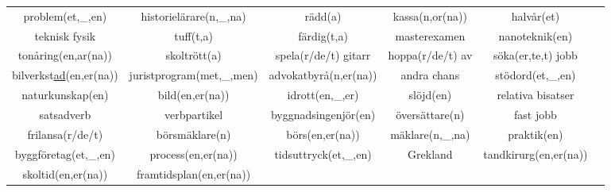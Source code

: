 \begin{center}
\begin{adjustwidth}{-2.55cm}{}
\begin{tabular}{|c c c c c c|}
            problem(et,\_,en) & historielärare(n,\_,na) & rädd(a) & kassa(n,or(na)) & halvår(et) &  \\
            teknisk fysik & tuff(t,a) & färdig(t,a) & masterexamen & nanoteknik(en) &  \\
            tonåring(en,ar(na)) & skoltrött(a) & spela(r/de/t) gitarr & hoppa(r/de/t) av & söka(er,te,t) jobb &  \\
            bilverkst\underline{ad}(en,er(na)) & juristprogram(met,\_,men) & advokatbyrå(n,er(na)) & andra chans & stödord(et,\_,en) &  \\
            naturkunskap(en) & bild(en,er(na)) & idrott(en,\_,er) & slöjd(en) & relativa bisatser &  \\
            satsadverb & verbpartikel & byggnadsingenjör(en) & översättare(n) & fast jobb &  \\
            frilansa(r/de/t) & börsmäklare(n) & börs(en,er(na)) & mäklare(n,\_,na) & praktik(en) &  \\
            byggföretag(et,\_,en) & process(en,er(na)) & tidsuttryck(et,\_,en) & Grekland & tandkirurg(en,er(na)) &  \\
            skoltid(en,er(na)) & framtidsplan(en,er(na)) &  &  &  &  \\
            \hline
        \end{tabular}
    \end{adjustwidth}
\end{center}

